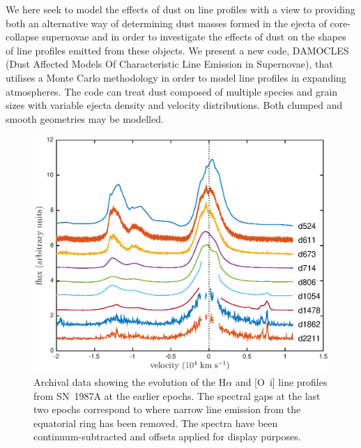 \documentclass[useAMS,usenatbib,usegraphicx]{mnras}
\begin{document}

We here seek to model  the effects of dust on line profiles with a 
view to providing both an alternative way of determining dust 
masses formed in the ejecta of core-collapse supernovae and in order to investigate 
the  effects of dust on the shapes of line profiles emitted from 
these objects.  We present a new code, DAMOCLES (Dust Affected Models Of 
Characteristic Line Emission in Supernovae), that utilises a Monte Carlo 
methodology in order to  model line profiles in expanding 
atmospheres.  The code can treat dust composed of multiple species 
and grain sizes with variable ejecta density and velocity distributions.  Both 
clumped and smooth geometries may be modelled.

\begin{figure}
\includegraphics[trim =39 10 45 15,clip=true,scale=0.51]{Ha_evol_early_1col2}
\caption{Archival data showing the evolution of the H$\alpha$ and
[O~{\sc i}] line profiles from SN~1987A at the earlier epochs. The 
spectral gaps at the last two epochs correspond to where narrow line 
emission from the equatorial ring has been removed. The spectra have been
continuum-subtracted and offsets applied for display purposes.}
\label{Ha_evol_early}
\end{figure}
\end{document}
